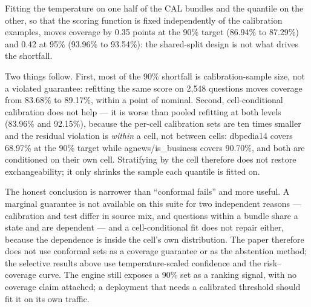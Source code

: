 Fitting the temperature on one half of the CAL bundles and the quantile on the other, so that the
scoring function is fixed independently of the calibration examples, moves coverage by 0.35 points
at the 90\% target (86.94\% to 87.29\%) and 0.42 at 95\% (93.96\% to 93.54\%): the shared-split
design is not what drives the shortfall.

Two things follow. First, most of the 90\% shortfall
is calibration-sample size, not a violated guarantee: refitting the same score on 2{,}548 questions
moves coverage from 83.68\% to 89.17\%, within a point of nominal. Second, cell-conditional
calibration does not help — it is worse than pooled refitting at both levels (83.96\% and 92.15\%),
because the per-cell calibration sets are ten times smaller and the residual violation is
\emph{within} a cell, not between cells: dbpedia14 covers 68.97\% at the 90\% target while
agnews/is\_business covers 90.70\%, and both are conditioned on their own cell. Stratifying by the
cell therefore does not restore exchangeability; it only shrinks the sample each quantile is fitted
on.

The honest conclusion is narrower than ``conformal fails'' and more useful. A marginal guarantee is
not available on this suite for two independent reasons — calibration and test differ in source mix,
and questions within a bundle share a state and are dependent — and a cell-conditional fit does not
repair either, because the dependence is inside the cell's own distribution. The paper therefore
does not use conformal sets as a coverage guarantee or as the abstention method; the selective
results above use temperature-scaled confidence and the risk--coverage curve. The engine still
exposes a 90\% set as a ranking signal, with no coverage claim attached; a deployment that needs a
calibrated threshold should fit it on its own traffic.

